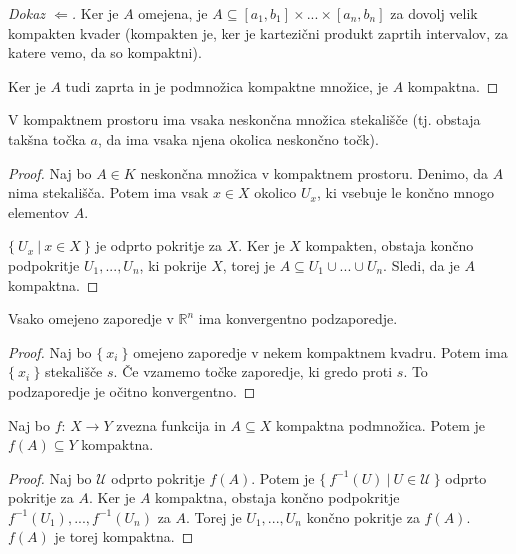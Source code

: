 \documentclass[11pt, a4paper]{article}
\begin{document}
    \begin{proof}[Dokaz \(\Longleftarrow\)]
        Ker je \(A\) omejena, je \(A \subseteq [a_1,b_1] \times ... \times [a_n, b_n]\) za dovolj velik kompakten kvader (kompakten je, ker je kartezični produkt zaprtih intervalov, za katere vemo, da so kompaktni).
        \par
        Ker je \(A\) tudi zaprta in je podmnožica kompaktne množice, je \(A\) kompaktna. 
    \end{proof}


    \begin{theorem}
        V kompaktnem prostoru ima vsaka neskončna množica stekališče (tj. obstaja takšna točka \(a\), da ima vsaka njena okolica neskončno točk).
    \end{theorem}

    \begin{proof}
        Naj bo \(A \in K\) neskončna množica v kompaktnem prostoru. Denimo, da \(A\) nima stekališča. Potem ima vsak \(x \in X\) okolico \(U_x\), ki vsebuje le končno mnogo elementov \(A\). 
        \par
        \(\{\ U_x\ |\ x \in X\ \}\) je odprto pokritje za \(X\). Ker je \(X\) kompakten, obstaja končno podpokritje \(U_1,...,U_n\), ki pokrije \(X\), torej je \(A \subseteq U_1 \cup ... \cup U_n\). Sledi, da je \(A\) kompaktna.
    \end{proof}

    \begin{corollary}
        Vsako omejeno zaporedje v \(\mathbb{R}^n\) ima konvergentno podzaporedje.
    \end{corollary}

    \begin{proof}
        Naj bo \(\{\ x_i\ \}\) omejeno zaporedje v nekem kompaktnem kvadru. Potem ima \(\{\ x_i\ \}\) stekališče \(s\). Če vzamemo točke zaporedje, ki gredo proti \(s\). To podzaporedje je očitno konvergentno.
    \end{proof}


    \begin{theorem}
        Naj bo \(f\): \(X \to Y\) zvezna funkcija in \(A \subseteq X\) kompaktna podmnožica. Potem je \(f(A) \subseteq Y\) kompaktna.
    \end{theorem}

    \begin{proof}
        Naj bo \(\mathscr{U}\) odprto pokritje \(f(A)\). Potem je \(\{\ f^{-1}(U)\ |\ U \in \mathscr{U}\ \}\) odprto pokritje za \(A\). Ker je \(A\) kompaktna, obstaja končno podpokritje \(f^{-1}(U_1),...,f^{-1}(U_n)\) za \(A\). Torej je \(U_1,...,U_n\) končno pokritje za \(f(A)\). \(f(A)\) je torej kompaktna.
    \end{proof}
\end{document}
